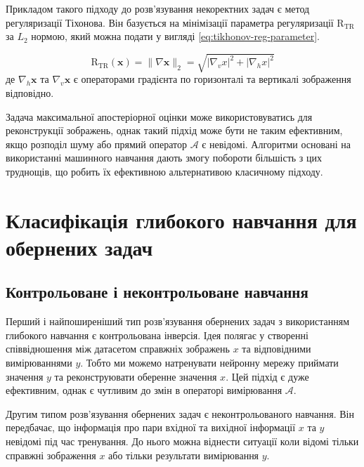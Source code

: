 \documentclass[14pt,a4paper]{extarticle}
\newcounter{e}
\numberwithin{equation}{section}
\numberwithin{figure}{section}
\begin{document}
	Прикладом такого підходу до розв'язування некоректних задач є метод регуляризації Тіхонова. Він базується на мінімізації параметра регуляризації $\mathrm{R}_{\mathrm{TR}}$ за $L_2$ нормою, який можна подати у вигляді \ref{eq:tikhonov-reg-parameter}.
	
	\begin{equation}
		\label{eq:tikhonov-reg-parameter}
		\mathrm{R}_{\mathrm{TR}}(\boldsymbol{x})
		=
		\|\nabla \boldsymbol{x}\|_{2} 
		=
		\sqrt{\left|\nabla_{v} x\right|^{2}+\left|\nabla_{h} x\right|^{2}}
	\end{equation}
	де $\nabla_{h} \boldsymbol{x}$ та $\nabla_{v} \boldsymbol{x}$ є операторами градієнта по горизонталі та вертикалі зображення відповідно.
	
	Задача максимальної апостеріорної оцінки може використовуватись для реконструкції зображень, однак такий підхід може бути не таким ефективним, якщо розподіл шуму або прямий оператор $\mathcal{A}$ є невідомі.  
	Алгоритми основані на використанні машинного навчання дають змогу побороти більшість з цих труднощів, що робить їх ефективною альтернативою класичному підходу.


	\newpage
	\thispagestyle{empty}
	\section{Класифікація глибокого навчання для обернених задач}

	\subsection{Контрольоване і неконтрольоване навчання}
	Перший і найпоширеніший тип розв'язування обернених задач з використанням глибокого навчання є контрольована інверсія. Ідея полягає у створенні співвідношення між датасетом справжніх зображень $x$ та відповідними вимірюваннями $y$. Тобто ми можемо натренувати нейронну мережу приймати значення $y$ та реконструювати оберенне значення $x$. Цей підхід є дуже ефективним, однак є чутливим до змін в операторі вимірювання $\mathcal{A}$. 
	
	Другим типом розв'язування обернених задач є неконтрольованого навчання. Він передбачає, що інформація про пари вхідної та вихідної інформації $x$ та $y$ невідомі під час тренування. До нього можна віднести ситуації коли відомі тільки справжні зображення $x$ або тільки результати вимірювання $y$.
	
\end{document}

